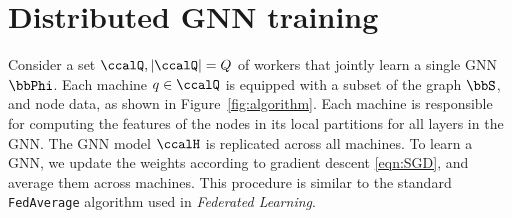 \documentclass[lettersize,journal]{IEEEtran}
\begin{document}

\section{Distributed GNN training}

Consider a set $\ccalQ,|\ccalQ|=Q$ of workers that jointly learn a single GNN $\bbPhi$. Each machine $q\in\ccalQ$ is equipped with a subset of the graph $\bbS$, and node data, as shown in Figure~\ref{fig:algorithm}. Each machine is responsible for computing the features of the nodes in its local partitions for all layers in the GNN. The GNN model $\ccalH$ is replicated across all machines. To learn a GNN, we update the weights according to gradient descent \eqref{eqn:SGD}, and average them across machines. This procedure is similar to the standard \texttt{FedAverage} algorithm used in \textit{Federated Learning}\cite{li2020federated}.
\end{document}
